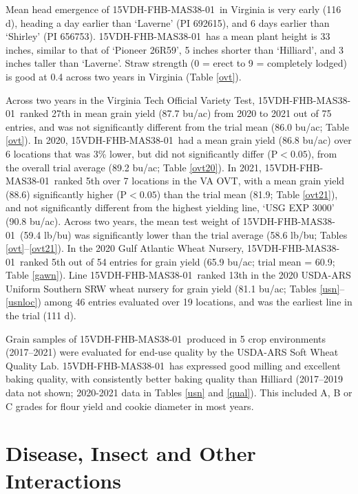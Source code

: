 \documentclass[12pt, letterpaper]{article}
\newcommand{\lin}{15VDH-FHB-MAS38-01~}
\begin{document}
Mean head emergence of \lin in Virginia is very early (116 d), heading a day earlier than `Laverne' (PI 692615), and 6 days earlier than `Shirley' (PI 656753). \lin has a mean plant height is 33 inches, similar to that of `Pioneer 26R59', 5 inches shorter than `Hilliard', and 3 inches taller than `Laverne'. Straw strength (0 = erect to 9 = completely lodged) is good at 0.4 across two years in Virginia (Table \ref{ovt}). 

Across two years in the Virginia Tech Official Variety Test, \lin ranked 27th in mean grain yield (87.7 bu/ac) from 2020 to 2021 out of 75 entries, and was not significantly different from the trial mean (86.0 bu/ac; Table \ref{ovt}). In 2020, \lin had a mean grain yield (86.8 bu/ac) over 6 locations that was 3\% lower, but did not significantly differ (P$<0.05$), from the overall trial average (89.2 bu/ac; Table \ref{ovt20}). In 2021, \lin ranked 5th over 7 locations in the VA OVT, with a mean grain yield (88.6) significantly higher (P$<0.05$) than the trial mean (81.9; Table \ref{ovt21}), and not significantly different from the highest yielding line, `USG EXP 3000' (90.8 bu/ac). Across two years, the mean test weight of \lin (59.4 lb/bu) was significantly lower than the trial average (58.6 lb/bu; Tables \ref{ovt}--\ref{ovt21}). In the 2020 Gulf Atlantic Wheat Nursery, \lin ranked 5th out of 54 entries for grain yield (65.9 bu/ac; trial mean = 60.9; Table \ref{gawn}). Line \lin ranked 13th in the 2020 USDA-ARS Uniform Southern SRW wheat nursery for grain yield (81.1 bu/ac; Tables \ref{usn}--\ref{usnloc}) among 46 entries evaluated over 19 locations, and was the earliest line in the trial (111 d). 

Grain samples of \lin produced in 5 crop environments (2017--2021) were evaluated for end-use quality by the USDA-ARS Soft Wheat Quality Lab.  \lin has expressed good milling and excellent baking quality, with consistently better baking quality than Hilliard (2017--2019 data not shown; 2020-2021 data in Tables \ref{usn} and \ref{qual}). This included A, B or C grades for flour yield and cookie diameter in most years. 


\section{Disease, Insect and Other Interactions}
\end{document}
